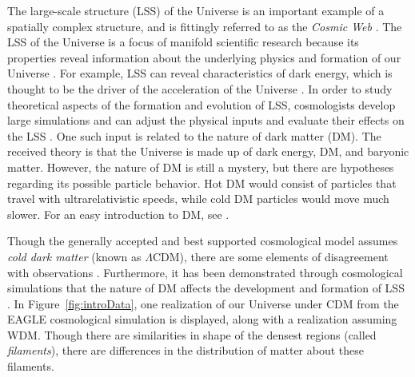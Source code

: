 \documentclass[12pt]{article}
\newcommand{\figref}[1]{Figure~\ref{#1}}
\begin{document}
The large-scale structure (LSS) of the Universe is an important example of a spatially complex structure, and is fittingly referred to as the \emph{Cosmic Web} \citep{bond1996filaments,springel2006large}. The LSS of the Universe is a focus of manifold scientific research because its properties reveal information about the underlying physics and formation of our Universe \citep{davis1985evolution}.  For example, LSS can reveal characteristics of dark energy, which is thought to be the driver of the acceleration of the Universe \citep{Sanchez:2012aa}.  In order to study theoretical aspects of the formation and evolution of LSS, cosmologists develop large simulations and can adjust the physical inputs and evaluate their effects on the LSS \citep{cooray2002halo,centrella1983three,doroshkevich1980two,schaye2015eagle}. One such input is related to the nature of dark matter (DM). The received theory is that the Universe is made up of dark energy, DM, and baryonic matter. However, the nature of DM is still a mystery, but there are hypotheses regarding its possible particle behavior. Hot DM would consist of particles that travel with ultrarelativistic speeds, while cold DM particles would move much slower. For an easy introduction to DM, see \cite[p. 61-63]{HilbeEtAl2014}.

Though the generally accepted and best supported cosmological model assumes \emph{cold dark matter} (known as $\Lambda$CDM), there are some elements of disagreement with observations \citep{SchneiderEtAl2012}. Furthermore, it has been demonstrated through cosmological simulations that the nature of DM affects the development and formation of LSS \citep{SchneiderEtAl2012}.
In \figref{fig:introData}, one realization of our Universe under CDM from the EAGLE cosmological simulation \citep{schaye2015eagle} is displayed, along with a realization assuming WDM. Though there are similarities in shape of the densest regions (called \emph{filaments}), there are differences in the distribution of matter about these filaments.
\end{document}
